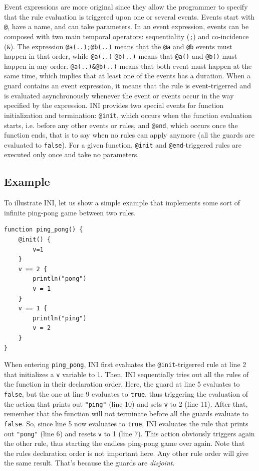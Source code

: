 \documentclass{sig-alternate}
\begin{document}
Event expressions are more original since they allow the programmer to specify that the rule evaluation is triggered upon one or several events. Events start with \texttt{@}, have a name, and can take parameters. In an event expression, events can be composed with two main temporal operators: sequentiality (\texttt{;}) and co-incidence (\texttt{\&}). The expression \texttt{@a(..);@b(..)} means that the \texttt{@a} and \texttt{@b} events must happen in that order, while \texttt{@a(..)} \texttt{@b(..)} means that \texttt{@a()} and \texttt{@b()} must happen in any order. \texttt{@a(..)\&@b(..)} means that both event must happen at the same time, which implies that at least one of the events has a duration. When a guard contains an event expression, it means that the rule is event-trigerred and is evaluated asynchronously whenever the event or events occur in the way specified by the expression. INI provides two special events for function initialization and termination: \texttt{@init}, which occurs when the function evaluation starts, i.e. before any other events or rules, and \texttt{@end}, which occurs once the function ends, that is to say when no rules can apply anymore (all the guards are evaluated to \texttt{false}). For a given function, \texttt{@init} and \texttt{@end}-triggered rules are executed only once and take no parameters.

\subsection{Example}

To illustrate INI, let us show a simple example that implements some sort of infinite ping-pong game between two rules.

\begin{lstlisting}
function ping_pong() {
	@init() {
		v=1
	}
	v == 2 {
		println("pong")
		v = 1
	}
	v == 1 {
		println("ping")
		v = 2
	}
}
\end{lstlisting}

When entering \texttt{ping\_pong}, INI first evaluates the \texttt{@init}-trigerred rule at line 2 that initializes a \texttt{v} variable to 1. Then, INI sequentially tries out all the rules of the function in their declaration order. Here, the guard at line 5 evaluates to \texttt{false}, but the one at line 9 evaluates to \texttt{true}, thus triggering the evaluation of the action that prints out \texttt{"ping"} (line 10) and sets \texttt{v} to 2 (line 11). After that, remember that the function will not terminate before all the guards evaluate to \texttt{false}. So, since line 5 now evaluates to \texttt{true}, INI evaluates the rule that prints out \texttt{"pong"} (line 6) and resets \texttt{v} to 1 (line 7). This action obviously triggers again the other rule, thus starting the endless ping-pong game over again. Note that the rules declaration order is not important here. Any other rule order will give the same result. That's because the guards are \emph{disjoint}.
\end{document}
